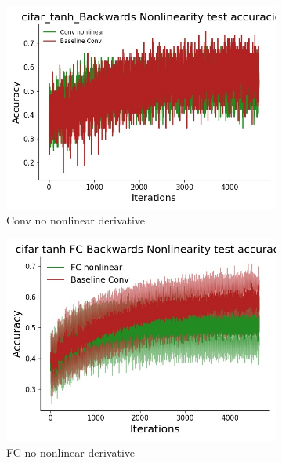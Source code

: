 \begin{figure}[htb]
\medskip
\begin{subfigure}{0.3\textwidth}
  \includegraphics[width=\linewidth]{chapter_6_figures/AR/cifar_tanh_Backwards_Nonlinearity_test_accuracies_prelim_1.jpg}
  \caption{Conv no nonlinear derivative}
\end{subfigure}\hfil %
\begin{subfigure}{0.3\textwidth}
  \includegraphics[width=\linewidth]{chapter_6_figures/AR/cifar_tanh_FC_Backwards_Nonlinearity_test_accuracies_prelim_1.jpg}
  \caption{FC no nonlinear derivative}
\end{subfigure}\hfil %
\begin{subfigure}{0.3\textwidth}

\end{subfigure}
\end{figure}
